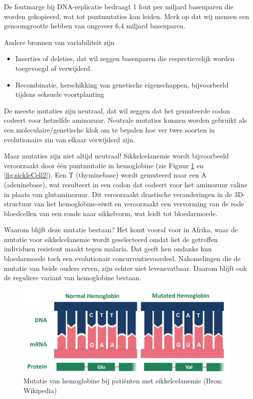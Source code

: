 \documentclass[
  11pt,
]{book}
\providecommand{\tightlist}{%
  \setlength{\itemsep}{0pt}\setlength{\parskip}{0pt}}
\begin{document}
De foutmarge bij DNA-replicatie bedraagt 1 fout per miljard basenparen die worden gekopieerd, wat tot puntmutaties kan leiden. Merk op dat wij mensen een genoomgrootte hebben van ongeveer 6,4 miljard basenparen.

Andere bronnen van variabiliteit zijn

\begin{itemize}
\tightlist
\item
  Inserties of deleties, dat wil zeggen basenparen die respectievelijk worden toegevoegd of verwijderd.
\item
  Recombinatie, herschikking van genetische eigenschappen, bijvoorbeeld tijdens seksuele voortplanting
\end{itemize}

De meeste mutaties zijn neutraal, dat wil zeggen dat het gemuteerde codon codeert voor hetzelfde aminozuur. Neutrale mutaties kunnen worden gebruikt als een moleculaire/genetische klok om te bepalen hoe ver twee soorten in evolutionaire zin van elkaar verwijderd zijn.

Maar mutaties zijn niet altijd neutraal! Sikkelcelanemie wordt bijvoorbeeld veroorzaakt door één puntmutatie in hemoglobine (zie Figuur \ref{fig:sickleCell1} en \ref{fig:sickleCell2}). Een T (thyminebase) wordt gemuteerd naar een A (adeninebase), wat resulteert in een codon dat codeert voor het aminozuur valine in plaats van glutaminezuur. Dit veroorzaakt drastische veranderingen in de 3D-structuur van het hemoglobine-eiwit en veroorzaakt een vervorming van de rode bloedcellen van een ronde naar sikkelvorm, wat leidt tot bloedarmoede.

Waarom blijft deze mutatie bestaan? Het komt vooral voor in Afrika, waar de mutatie voor sikkelcelanemie wordt geselecteerd omdat het de getroffen individuen resistent maakt tegen malaria. Dat geeft hen ondanks hun bloedarmoede toch een evolutionair concurrentievoordeel. Nakomelingen die de mutatie van beide ouders erven, zijn echter niet levensvatbaar. Daarom blijft ook de reguliere variant van hemoglobine bestaan.

\begin{figure}

{\centering \includegraphics[width=0.45\linewidth]{./figs/sickleCellWikipedia2} 

}

\caption{Mutatie van hemoglobine bij patiënten met sikkelcelanemie (Bron: Wikipedia)}\label{fig:sickleCell1}
\end{figure}
\end{document}
